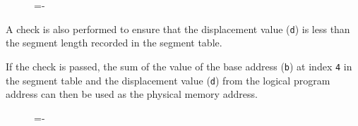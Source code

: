 \documentclass[a4paper]{systems-software}
\begin{document}
\begin{figure}[H]
  \lineskip=-\fboxrule
\end{figure}

A check is also performed to ensure that the displacement value (\texttt{d}) is less than the segment length recorded in the segment table.

If the check is passed, the sum of the value of the base address (\texttt{b}) at index \texttt{4} in the segment table and the displacement value (\texttt{d}) from the logical program address can then be used as the physical memory address.

\begin{figure}[H]
  \lineskip=-\fboxrule
\end{figure}
\end{document}
